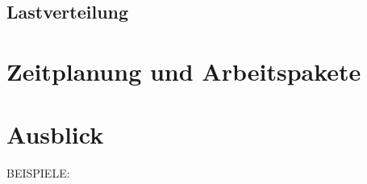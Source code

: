 \subsection{Lastverteilung}


\section{Zeitplanung und Arbeitspakete}

\section{Ausblick}

BEISPIELE:

